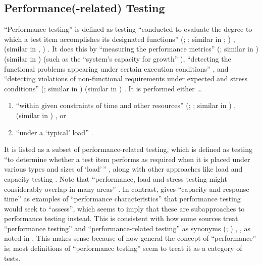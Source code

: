\scalGraphs{}

\subsection{Performance(-related) Testing}
\label{perf-test-rec}

``Performance testing'' is defined as testing ``conducted to evaluate the
degree to which a test item accomplishes its designated functions''
\ifnotpaper
    (\citealp[p.~7]{IEEE2022}; \citeyear[p.~320]{IEEE2017}; similar in
    \citeyear[pp.~38-39]{IEEE2021}; \citealp[p.~1187]{Moghadam2019})%
\else
    \cite[p.~320]{IEEE2017}, \cite[p.~7]{IEEE2022} (similar in
    \cite[pp.~38-39]{IEEE2021}, \cite[p.~1187]{Moghadam2019})%
\fi. It does this
by ``measuring the performance metrics''
\ifnotpaper
    (\citealp[p.~1187]{Moghadam2019}; similar in \citealpISTQB{})
\else
    \cite[p.~1187]{Moghadam2019} (similar in \cite{ISTQB})
\fi (such as the ``system's capacity for growth''
\citep[p.~23]{Gerrard2000b}), ``detecting the functional problems appearing
under certain execution conditions'' \citep[p.~1187]{Moghadam2019}, and
``detecting violations of non-functional requirements under expected and
stress conditions'' \ifnotpaper
    (\citealp[p.~1187]{Moghadam2019}; similar in \citealp[p.~5-9]{SWEBOK2024})%
\else
    \cite[p.~1187]{Moghadam2019} (similar in \cite[p.~5-9]{SWEBOK2024})%
\fi. It is performed either \dots\
\begin{enumerate}
    \item ``within given constraints of time and other resources''
          \ifnotpaper
              (\citealp[p.~7]{IEEE2022}; \citeyear[p.~320]{IEEE2017};
              similar in \citealp[p.~1187]{Moghadam2019})%
          \else
              \cite[p.~320]{IEEE2017}, \cite[p.~7]{IEEE2022} (similar
              in \cite[p.~1187]{Moghadam2019})%
          \fi, or
    \item ``under a `typical' load'' \citep[p.~39]{IEEE2021}.
\end{enumerate}

It is listed as a subset of performance-related testing, which is defined as
testing ``to determine whether a test item performs as required when it is
placed under various types and sizes of `load'\,'' \citeyearpar[p.~38]{IEEE2021},
along with other approaches like load and capacity testing
\citep[p.~22]{IEEE2022}. Note that ``performance, load and stress testing might
considerably overlap in many areas'' \citep[p.~1187]{Moghadam2019}.
In contrast, \citet[p.~5-9]{SWEBOK2024}
gives ``capacity and response time'' as examples of ``performance
characteristics'' that performance testing would seek to ``assess'', which
seems to imply that these are subapproaches to performance testing instead.
This is consistent with how some sources treat ``performance testing'' and
``performance-related testing'' as synonyms \ifnotpaper
    (\citealp[p.~5-9]{SWEBOK2024}; \citealp[p.~1187]{Moghadam2019})%
\else \cite[p.~5-9]{SWEBOK2024}, \cite[p.~1187]{Moghadam2019}%
\fi, as noted in . This makes sense because of how general the
concept of ``performance'' is; most definitions of ``performance testing'' seem
to treat it as a category of tests.

